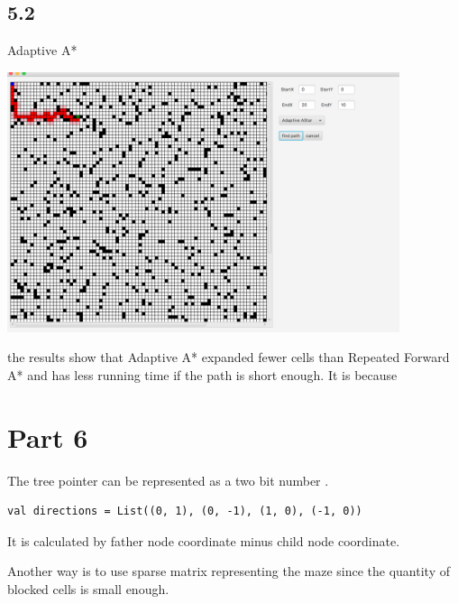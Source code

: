\documentclass[12pt]{amsart}
\begin{document}
\subsection*{5.2}
Adaptive A*

\includegraphics[width=1\linewidth,height=3in]{adaptive_a_star.png}

the results show that Adaptive A* expanded fewer cells than Repeated Forward A* and has less running time if the path is short enough. It is because
\newpage
\section*{Part 6}
The tree pointer can be represented as a two bit number .
\begin{lstlisting}
val directions = List((0, 1), (0, -1), (1, 0), (-1, 0))
\end{lstlisting}
It is calculated by father node coordinate minus child node coordinate.

Another way is to use sparse matrix representing the maze since the quantity of blocked cells is small enough.
\end{document}
